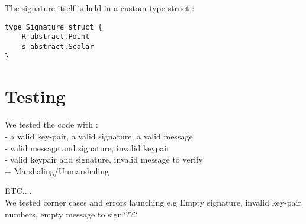 \documentclass{article}
\begin{document}
\noindent
The signature itself is held in a custom type struct :
\begin{verbatim}
type Signature struct {
    R abstract.Point
    s abstract.Scalar
}    
\end{verbatim}





\section{Testing}

We tested the code with : \\
- a valid key-pair, a valid signature, a valid message \\
- valid message and signature, invalid keypair \\
- valid keypair and signature, invalid message to verify \\
+ Marshaling/Unmarshaling

ETC.... \\

We tested corner cases and errors launching e.g Empty signature, invalid key-pair numbers, empty message to sign???? \\
\end{document}
